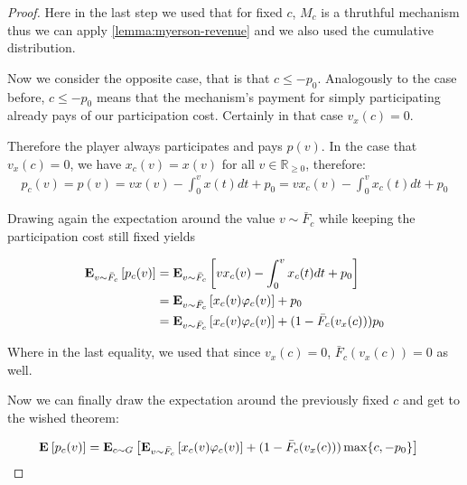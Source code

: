 \documentclass[11pt,a4paper]{article}
\newcommand{\RR}{\ensuremath{\mathbb{R}}}
\newcommand{\Ex}[2][]{\mbox{\rm\bf E}_{#1}\left[#2\right]}
\newcommand{\1}[1]{\mbox{\rm\bf 1}_{#1}}
\begin{document}
\begin{section}{}
\begin{proof}
     Here in the last step we used that for fixed $c$, $M_c$ is a thruthful mechanism thus we can apply \autoref{lemma:myerson-revenue} and we also used the cumulative distribution.

     Now we consider the opposite case, that is that $c \leq -p_0$.
     Analogously to the case before, $c \leq -p_0$ means that the mechanism's payment for simply participating already pays of our participation cost.
     Certainly in that case $v_x(c) = 0$.

     Therefore the player always participates and pays $p(v)$. In the case that $v_x(c) = 0$, we have $x_c(v) = x(v)$ for all $v \in \RR_{\geq 0}$, therefore:
     \begin{align*}
         p_c(v) = p(v) = v x(v) - \int_0^v x(t)dt + p_0 = v x_c(v) - \int_0^v x_c(t)dt + p_0
     \end{align*}

     Drawing again the expectation around the value $v \sim \bar{F}_c$ while keeping the participation cost still fixed yields


     \begin{align*}
         \Ex[v \sim \bar{F}_c]{p_c(v)} & = \Ex[v \sim \bar{F}_c]{v x_c(v) - \int_0^v x_c(t)dt + p_0}                  \\
                                       & = \Ex[v \sim \bar{F}_c]{x_c(v) \varphi_c(v)} + p_0                           \\
                                       & = \Ex[v \sim \bar{F}_c]{x_c(v) \varphi_c(v)} + (1 - \bar{F}_{c}(v_x(c))) p_0
     \end{align*}

     Where in the last equality, we used that since $v_x(c) = 0$, $\bar{F}_{c}(v_x(c)) = 0$ as well.

     Now we can finally draw the expectation around the previously fixed $c$ and get to the wished theorem:

     \begin{align*}
         \Ex{p_c(v)} & = \Ex[c \sim G]{\Ex[v \sim \bar{F}_c]{x_c(v) \varphi_c(v)} + (1 - \bar{F}_{c}(v_x(c))) \max\{c, -p_0\} }
     \end{align*}
 \end{proof}

\end{section}


\end{document}
